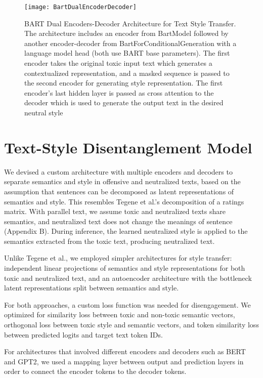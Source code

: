 \documentclass[11pt]{article}
\begin{document}
\begin{figure}[htp]
    \centering
    \texttt{[image: BartDualEncoderDecoder]}
    \caption{BART Dual Encoders-Decoder Architecture for Text Style Transfer. The architecture includes an encoder from BartModel followed by another encoder-decoder from BartForConditionalGeneration with a language model head (both use BART base parameters). The first encoder takes the original toxic input text which generates a contextualized representation, and a masked sequence is passed to the second encoder for generating style representation. The first encoder’s last hidden layer is passed as cross attention to the decoder which is used to generate the output text in the desired neutral style}
    \label{fig:galaxy}
\end{figure}

\section{Text-Style Disentanglement Model}

We devised a custom architecture with multiple encoders and decoders to separate semantics and style in offensive and neutralized texts, based on the assumption that sentences can be decomposed as latent representations of semantics and style. This resembles Tegene et al.'s decomposition of a ratings matrix. With parallel text, we assume toxic and neutralized texts share semantics, and neutralized text does not change the meanings of sentence (Appendix B). During inference, the learned neutralized style is applied to the semantics extracted from the toxic text, producing neutralized text.

Unlike Tegene et al., we employed simpler architectures for style transfer: independent linear projections of semantics and style representations for both toxic and neutralized text, and an autoencoder architecture with the bottleneck latent representations split between semantics and style.

For both approaches, a custom loss function was needed for disengagement. We optimized for similarity loss between toxic and non-toxic semantic vectors, orthogonal loss between toxic style and semantic vectors, and token similarity loss between predicted logits and target text token IDs.

For architectures that involved different encoders and decoders such as BERT and GPT2, we used a mapping layer between output and prediction layers in order to connect the encoder tokens to the decoder tokens.
\end{document}
